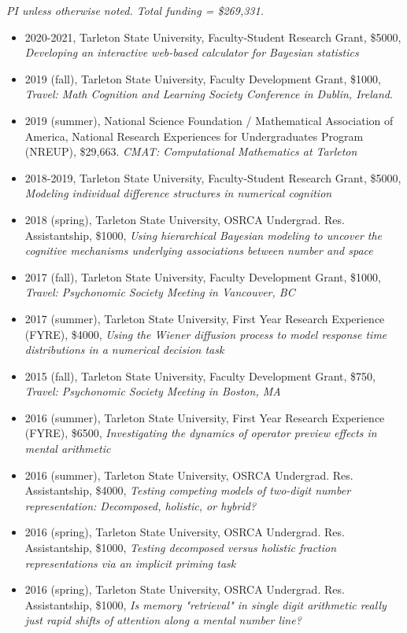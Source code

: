 \documentclass[article,10pt]{article}
\begin{document}
\emph{PI unless otherwise noted.  Total funding = \$269,331.}

\begin{itemize}
\item 2020-2021, Tarleton State University, Faculty-Student Research Grant, \$5000, \emph{Developing an interactive web-based calculator for Bayesian statistics}
\item 2019 (fall), Tarleton State University, Faculty Development Grant, \$1000, \emph{Travel: Math Cognition and Learning Society Conference in Dublin, Ireland}.
\item 2019 (summer), National Science Foundation / Mathematical Association of America, National Research Experiences for Undergraduates Program (NREUP), \$29,663. \emph{CMAT: Computational Mathematics at Tarleton}
\item 2018-2019, Tarleton State University, Faculty-Student Research Grant, \$5000, \emph{Modeling individual difference structures in numerical cognition}
\item 2018 (spring), Tarleton State University, OSRCA Undergrad. Res. Assistantship, \$1000, \emph{Using hierarchical Bayesian modeling to uncover the cognitive mechanisms underlying associations between number and space}
\item 2017 (fall), Tarleton State University, Faculty Development Grant, \$1000, \emph{Travel: Psychonomic Society Meeting in Vancouver, BC}
\item 2017 (summer), Tarleton State University, First Year Research Experience (FYRE), \$4000, \emph{Using the Wiener diffusion process to model response time distributions in a numerical decision task}
\item 2015 (fall), Tarleton State University, Faculty Development Grant, \$750, \emph{Travel: Psychonomic Society Meeting in Boston, MA}
\item 2016 (summer), Tarleton State University, First Year Research Experience (FYRE), \$6500, \emph{Investigating the dynamics of operator preview effects in mental arithmetic}
\item 2016 (summer), Tarleton State University, OSRCA Undergrad. Res. Assistantship, \$4000, \emph{Testing competing models of two-digit number representation: Decomposed, holistic, or hybrid?}
\item 2016 (spring), Tarleton State University, OSRCA Undergrad. Res. Assistantship, \$1000, \emph{Testing decomposed versus holistic fraction representations via an implicit priming task}
\item 2016 (spring), Tarleton State University, OSRCA Undergrad. Res. Assistantship, \$1000, \emph{Is memory "retrieval" in single digit arithmetic really just rapid shifts of attention along a mental number line?}

\end{itemize}
\end{document}
